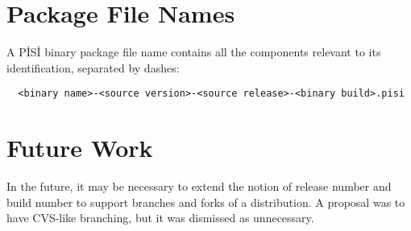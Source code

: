 \documentclass[a4paper,11pt]{article}
\begin{document}
\section{Package File Names}

A P\.IS\.I binary package file name contains all the components relevant
to its identification, separated by dashes:
\begin{verbatim}
  <binary name>-<source version>-<source release>-<binary build>.pisi
\end{verbatim}

\section{Future Work}

In the future, it may be necessary to extend the notion of release
number and build number to support branches and forks of a
distribution. A proposal was to have CVS-like branching, but it
was dismissed as unnecessary.
\end{document}
